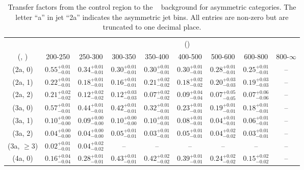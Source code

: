 \begin{table}[h!]
\tiny
\centering
\caption{Transfer factors from the \mj control region to the \zInv~ background for asymmetric categories. The letter ``a'' in jet \eg ``2a''  indicates the asymmetric jet bins. All entries are non-zero but are truncated to one decimal place.\label{tab:tf_mu_zinv_asym}}
\begin{tabular}
{ccccccccc}
	\hline\hline
&	& \multicolumn{8}{c}{\scalht (\gev)} \\ 
	 (\njet,  \nb) & 200-250 & 250-300 & 300-350 & 350-400 & 400-500 & 500-600 & 600-800 & 800-$\infty$ \\ [0.8ex] 
\hline
	(2a, 0) & $0.55^{+ 0.01 }_{- 0.01 }$ & $0.34^{+ 0.01 }_{- 0.01 }$ & $0.30^{+ 0.01 }_{- 0.01 }$ & $0.30^{+ 0.01 }_{- 0.01 }$ & $0.30^{+ 0.01 }_{- 0.01 }$ & $0.28^{+ 0.01 }_{- 0.01 }$ & $0.25^{+ 0.01 }_{- 0.01 }$ & -- \\[0.5ex] 
	(2a, 1) & $0.22^{+ 0.01 }_{- 0.01 }$ & $0.18^{+ 0.01 }_{- 0.01 }$ & $0.16^{+ 0.01 }_{- 0.01 }$ & $0.21^{+ 0.02 }_{- 0.02 }$ & $0.18^{+ 0.02 }_{- 0.02 }$ & $0.20^{+ 0.03 }_{- 0.03 }$ & $0.19^{+ 0.03 }_{- 0.03 }$ & -- \\[0.5ex] 
	(2a, 2) & $0.21^{+ 0.02 }_{- 0.02 }$ & $0.12^{+ 0.02 }_{- 0.02 }$ & $0.12^{+ 0.03 }_{- 0.03 }$ & $0.07^{+ 0.02 }_{- 0.02 }$ & $0.09^{+ 0.04 }_{- 0.04 }$ & $0.07^{+ 0.05 }_{- 0.05 }$ & $0.07^{+ 0.06 }_{- 0.06 }$ & -- \\[0.5ex] 
	(3a, 0) & $0.57^{+ 0.01 }_{- 0.01 }$ & $0.44^{+ 0.01 }_{- 0.01 }$ & $0.42^{+ 0.01 }_{- 0.01 }$ & $0.32^{+ 0.01 }_{- 0.01 }$ & $0.23^{+ 0.01 }_{- 0.01 }$ & $0.19^{+ 0.01 }_{- 0.01 }$ & $0.18^{+ 0.01 }_{- 0.01 }$ & -- \\[0.5ex] 
	(3a, 1) & $0.10^{+ 0.00 }_{- 0.00 }$ & $0.09^{+ 0.00 }_{- 0.00 }$ & $0.10^{+ 0.00 }_{- 0.00 }$ & $0.10^{+ 0.01 }_{- 0.01 }$ & $0.08^{+ 0.01 }_{- 0.01 }$ & $0.04^{+ 0.01 }_{- 0.01 }$ & $0.06^{+ 0.01 }_{- 0.01 }$ & -- \\[0.5ex] 
	(3a, 2) & $0.04^{+ 0.00 }_{- 0.00 }$ & $0.04^{+ 0.00 }_{- 0.00 }$ & $0.05^{+ 0.01 }_{- 0.01 }$ & $0.03^{+ 0.01 }_{- 0.01 }$ & $0.05^{+ 0.01 }_{- 0.01 }$ & $0.04^{+ 0.02 }_{- 0.02 }$ & $0.03^{+ 0.01 }_{- 0.01 }$ & -- \\[0.5ex] 
	(3a, $\ge3$) & $0.02^{+ 0.01 }_{- 0.01 }$ & $0.04^{+ 0.02 }_{- 0.02 }$ & -- & -- & -- & -- & -- & -- \\[0.5ex] 
	(4a, 0) & $0.16^{+ 0.04 }_{- 0.04 }$ & $0.28^{+ 0.01 }_{- 0.01 }$ & $0.43^{+ 0.01 }_{- 0.01 }$ & $0.42^{+ 0.02 }_{- 0.02 }$ & $0.39^{+ 0.01 }_{- 0.01 }$ & $0.24^{+ 0.02 }_{- 0.02 }$ & $0.15^{+ 0.02 }_{- 0.02 }$ & -- \\[0.5ex] 

\end{tabular}
\end{table}
